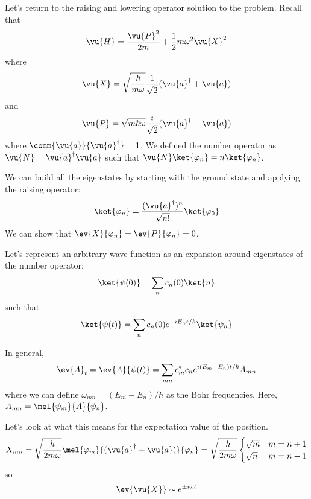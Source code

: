 \documentclass[a4paper,twoside,master.tex]{subfiles}
\begin{document}

Let's return to the raising and lowering operator solution to the problem. Recall that
\begin{equation}
    \vu{H} = \frac{\vu{P}^2}{2m} + \frac{1}{2} m \omega^2 \vu{X}^2
\end{equation}
where
\begin{equation}
    \vu{X} = \sqrt{\frac{\hbar}{m \omega}} \frac{1}{\sqrt{2}} (\vu{a}^\dagger + \vu{a})
\end{equation}
and
\begin{equation}
    \vu{P} = \sqrt{m \hbar \omega} \frac{\imath}{\sqrt{2}} (\vu{a}^\dagger - \vu{a})
\end{equation}
where $ \comm{\vu{a}}{ \vu{a}^\dagger} = 1 $. We defined the number operator as $ \vu{N} = \vu{a}^\dagger \vu{a} $ such that $ \vu{N}\ket{\varphi_n} = n\ket{\varphi_n} $.

We can build all the eigenstates by starting with the ground state and applying the raising operator:
\begin{equation}
    \ket{\varphi_n} = \frac{(\vu{a}^\dagger)^n}{\sqrt{n!}}\ket{\varphi_0}
\end{equation}
We can show that $ \ev{X}{\varphi_n} = \ev{P}{\varphi_n} = 0 $.

Let's represent an arbitrary wave function as an expansion around eigenstates of the number operator:
\begin{equation}
    \ket{\psi(0)} = \sum_n c_n(0)\ket{n}
\end{equation}
such that
\begin{equation}
    \ket{\psi(t)} = \sum_n c_n(0) e^{- \imath E_n t / \hbar}\ket{\psi_n}
\end{equation}

In general,
\begin{equation}
    \ev{A}_t = \ev{A}{\psi(t)} = \sum_{mn} c_m^* c_n e^{\imath (E_m - E_n)t / \hbar} A_{mn}
\end{equation}
where we can define $ \omega_{mn} = (E_m - E_n) / \hbar $ as the Bohr frequencies. Here, $ A_{mn} = \mel{\psi_m}{A}{\psi_n} $.

Let's look at what this means for the expectation value of the position.
\begin{equation}
    X_{mn} = \sqrt{\frac{\hbar}{2 m \omega}} \mel{\varphi_m}{( \vu{a}^\dagger + \vu{a})}{\varphi_n} = \sqrt{\frac{\hbar}{2m \omega}} \begin{cases} \sqrt{m} & m = n+1 \\ \sqrt{n} & m = n-1 \end{cases}
\end{equation}
so
\begin{equation}
    \ev{\vu{X}} \sim e^{\pm \imath \omega t}
\end{equation}
\end{document}
